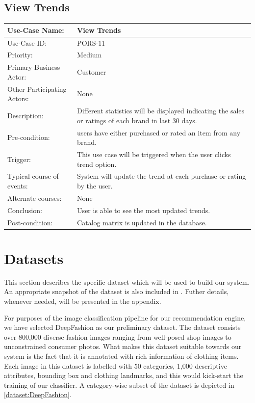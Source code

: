 \subsection{View Trends}
\begin{center}
    \begin{tabular}{ @{}|p{7cm}||p{7cm}|  }
    \hline
    Use-Case Name: & View Trends \\ \hline
    Use-Case ID: & PORS-11 \\ \hline
    Priority: & Medium \\ \hline
    Primary Business Actor: & Customer \\ \hline
    Other Participating Actors: & None \\ \hline
    Description: & Different statistics will be displayed indicating the sales or ratings of each brand in last 30 days.  \\ \hline
    Pre-condition: &  users have either purchased or rated an item from any brand.\\ \hline
    Trigger: &  This use case will be triggered when the user clicks trend option. \\ \hline
    Typical course of events: & System will update the trend at each purchase or rating by the user. \\ \hline
    Alternate courses: & None\\ \hline
    Conclusion: &  User is able to see the most updated trends. \\ \hline
    Post-condition: &  Catalog matrix is updated in the database.\\ \hline
    \end{tabular}
\end{center}

\section{Datasets}
This section describes the specific dataset which will be used to build our system. An appropriate snapshot of the dataset is also included in . Futher details, whenever needed, will be presented in the appendix.

For purposes of the image classification pipeline for our recommendation engine, we have selected DeepFashion \cite{DeepFashion} as our preliminary dataset. The dataset consists over 800,000 diverse fashion images ranging from well-posed shop images to unconstrained consumer photos. What makes this dataset suitable towards our system is the fact that it is annotated with rich information of clothing items. Each image in this dataset is labelled with 50 categories, 1,000 descriptive attributes, bounding box and clothing landmarks, and this would kick-start the training of our classifier. A category-wise subset of the dataset is depicted in \autoref{dataset:DeepFashion}. 

